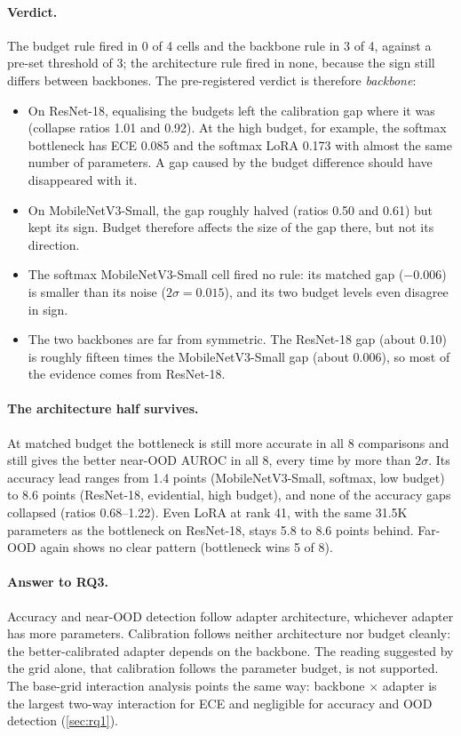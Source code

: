 \paragraph{Verdict.} The budget rule fired in 0 of 4 cells and the backbone rule in 3 of 4, against a
pre-set threshold of 3; the architecture rule fired in none, because the sign still differs between
backbones. The pre-registered verdict is therefore \emph{backbone}:
\begin{itemize}
\item On ResNet-18, equalising the budgets left the calibration gap where it was (collapse ratios 1.01 and
0.92). At the high budget, for example, the softmax bottleneck has ECE 0.085 and the softmax LoRA 0.173
with almost the same number of parameters. A gap caused by the budget difference should have
disappeared with it.
\item On MobileNetV3-Small, the gap roughly halved (ratios 0.50 and 0.61) but kept its sign. Budget
therefore affects the size of the gap there, but not its direction.
\item The softmax MobileNetV3-Small cell fired no rule: its matched gap ($-0.006$) is smaller than its
noise ($2\sigma = 0.015$), and its two budget levels even disagree in sign.
\item The two backbones are far from symmetric. The ResNet-18 gap (about 0.10) is roughly fifteen times the
MobileNetV3-Small gap (about 0.006), so most of the evidence comes from ResNet-18.
\end{itemize}

\paragraph{The architecture half survives.} At matched budget the bottleneck is still more accurate in
all 8 comparisons and still gives the better near-OOD AUROC in all 8, every time by more than $2\sigma$.
Its accuracy lead ranges from 1.4 points (MobileNetV3-Small, softmax, low budget) to 8.6 points
(ResNet-18, evidential, high budget), and none of the accuracy gaps collapsed (ratios 0.68--1.22). Even
LoRA at rank 41, with the same 31.5K parameters as the bottleneck on ResNet-18, stays 5.8 to 8.6 points
behind. Far-OOD again shows no clear pattern (bottleneck wins 5 of 8).

\paragraph{Answer to RQ3.} Accuracy and near-OOD detection follow adapter architecture, whichever adapter
has more parameters. Calibration follows neither architecture nor budget cleanly: the better-calibrated
adapter depends on the backbone. The reading suggested by the grid alone, that calibration follows the
parameter budget, is not supported. The base-grid interaction analysis points the same way: backbone
$\times$ adapter is the largest two-way interaction for ECE and negligible for accuracy and OOD detection
(\cref{sec:rq1}).


